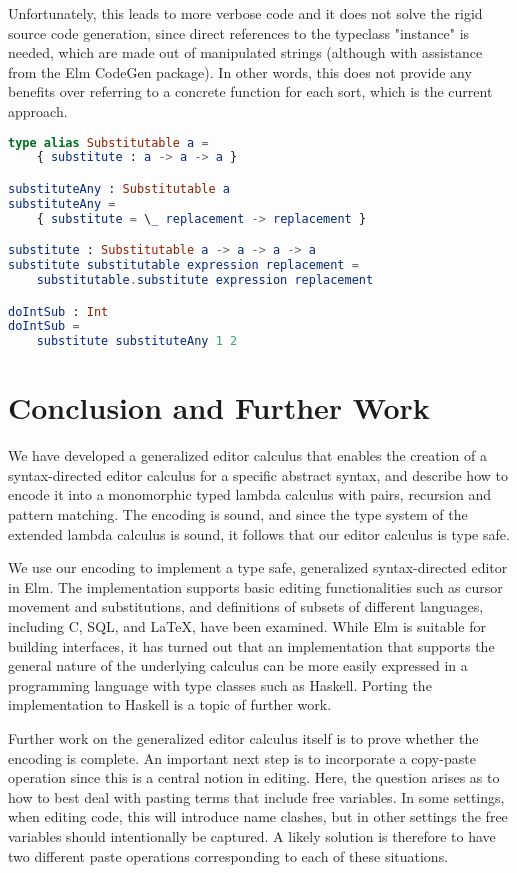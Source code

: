 \documentclass[sigplan,screen]{acmart}
\begin{document}
Unfortunately, this leads to more verbose code and it does not solve the rigid source code generation, since direct references to the typeclass "instance" is needed, which are made out of manipulated strings (although with assistance from the Elm CodeGen package). In other words, this
does not provide any benefits over referring to a concrete function for
each sort, which is the current approach.

\begin{lstlisting}[language=elm,style=inline,caption={Elm typeclass simulation example},label={lst:elm-typeclass}]
type alias Substitutable a =
    { substitute : a -> a -> a }

substituteAny : Substitutable a
substituteAny =
    { substitute = \_ replacement -> replacement }

substitute : Substitutable a -> a -> a -> a
substitute substitutable expression replacement =
    substitutable.substitute expression replacement

doIntSub : Int
doIntSub =
    substitute substituteAny 1 2
\end{lstlisting}


\section{Conclusion and Further Work}

We have developed a generalized editor calculus that enables the
creation of a syntax-directed editor calculus for a specific abstract
syntax, and describe how to encode it into a monomorphic typed lambda
calculus with pairs, recursion and pattern matching. The encoding is
sound, and since the type system of the
extended lambda calculus is sound, it follows that our editor calculus
is type safe.

We use our encoding to implement a type safe, generalized
syntax-directed editor in Elm.  The implementation supports basic editing
functionalities such as cursor movement and substitutions, and
definitions of subsets of different languages, including C, SQL, and
\LaTeX, have been examined. While Elm is suitable for building
interfaces, it has turned out that an implementation that supports the
general nature of the underlying calculus can be more easily expressed
in a programming language with type classes such as Haskell. Porting
the implementation to Haskell is a topic of further work.

Further work on the generalized editor calculus itself is to prove whether
the encoding is complete.  An important next step is to
incorporate a copy-paste operation since this is a central notion in
editing. Here, the question arises as to how to best deal with pasting
terms that include free variables. In some settings, when editing
code, this will introduce name clashes, but in other settings the free
variables should intentionally be captured. A likely solution is
therefore to have two different paste operations corresponding to each
of these situations.


\balance

\end{document}
